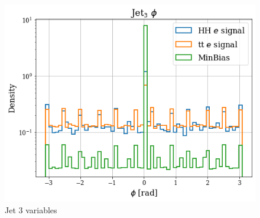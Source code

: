 \documentclass[../main.tex]{subfiles}
\begin{document}
\begin{figure}[!ht]
\begin{minipage}[b]{0.33\linewidth}
    \centering
    \includegraphics[width=1\linewidth]{Chapters/Plots/Hist_1ele_jet3_Phi.png}
  \end{minipage}
  \caption{Jet 3 variables}
\end{figure}
\end{document}
